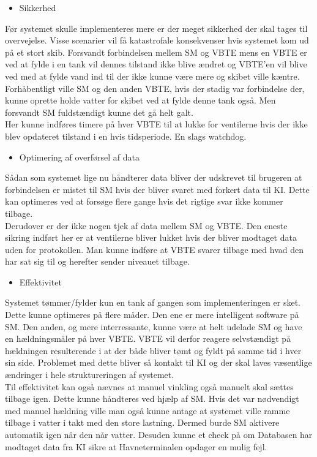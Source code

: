\begin{large}\begin{itemize}
\item Sikkerhed
\end{itemize}\end{large}
Før systemet skulle implementeres mere er der meget sikkerhed der skal tages til overvejelse. Visse scenarier vil få katastrofale konsekvenser hvis systemet kom ud på et stort skib. Forsvandt forbindelsen mellem SM og VBTE mens en VBTE er ved at fylde i en tank vil dennes tilstand ikke blive ændret og VBTE'en vil blive ved med at fylde vand ind til der ikke kunne være mere og skibet ville kæntre. Forhåbentligt ville SM og den anden VBTE, hvis der stadig var forbindelse der, kunne oprette holde vatter for skibet ved at fylde denne tank også. Men forsvandt SM fuldstændigt kunne det gå helt galt.\\
Her kunne indføres timere på hver VBTE til at lukke for ventilerne hvis der ikke blev opdateret tilstand i en hvis tidsperiode. En slags watchdog.
\begin{large}\begin{itemize}
\item Optimering af overførsel af data
\end{itemize}\end{large}
Sådan som systemet lige nu håndterer data bliver der udskrevet til brugeren at forbindelsen er mistet til SM hvis der bliver svaret med forkert data til KI. Dette kan optimeres ved at forsøge flere gange hvis det rigtige svar ikke kommer tilbage. \\
Derudover er der ikke nogen tjek af data mellem SM og VBTE. Den eneste sikring indført her er at ventilerne bliver lukket hvis der bliver modtaget data uden for protokollen. Man kunne indføre at VBTE svarer tilbage med hvad den har sat sig til og herefter sender niveauet tilbage.
\begin{large}\begin{itemize}
\item Effektivitet
\end{itemize}\end{large}
Systemet tømmer/fylder kun en tank af gangen som implementeringen er sket. Dette kunne optimeres på flere måder. Den ene er mere intelligent software på SM. Den anden, og mere interressante, kunne være at helt udelade SM og have en hældningsmåler på hver VBTE. VBTE vil derfor reagere selvstændigt på hældningen resulterende i at der både bliver tømt og fyldt på samme tid i hver sin side. Problemet med dette bliver så kontakt til KI og der skal laves væsentlige ændringer i hele struktureringen af systemet.\\
Til effektivitet kan også nævnes at manuel vinkling også manuelt skal sættes tilbage igen. Dette kunne håndteres ved hjælp af SM. Hvis det var nødvendigt med manuel hældning ville man også kunne antage at systemet ville ramme tilbage i vatter i takt med den store lastning. Dermed burde SM aktivere automatik igen når den når vatter. Desuden kunne et check på om Databasen har modtaget data fra KI sikre at Havneterminalen opdager en mulig fejl.